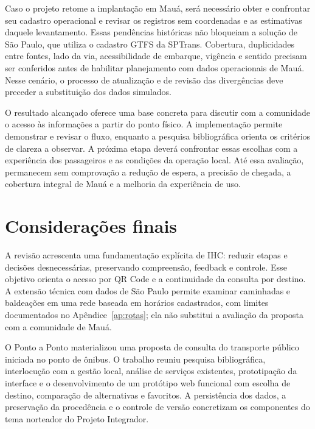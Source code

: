 \documentclass[12pt,oneside,a4paper,brazil,chapter=TITLE]{abntex2}
\begin{document}
Caso o projeto retome a implantação em Mauá, será necessário obter e confrontar seu cadastro operacional e revisar os registros sem coordenadas e as estimativas daquele levantamento. Essas pendências históricas não bloqueiam a solução de São Paulo, que utiliza o cadastro GTFS da SPTrans. Cobertura, duplicidades entre fontes, lado da via, acessibilidade de embarque, vigência e sentido precisam ser conferidos antes de habilitar planejamento com dados operacionais de Mauá. Nesse cenário, o processo de atualização e de revisão das divergências deve preceder a substituição dos dados simulados.

O resultado alcançado oferece uma base concreta para discutir com a comunidade o acesso às informações a partir do ponto físico. A implementação permite demonstrar e revisar o fluxo, enquanto a pesquisa bibliográfica orienta os critérios de clareza a observar. A próxima etapa deverá confrontar essas escolhas com a experiência dos passageiros e as condições da operação local. Até essa avaliação, permanecem sem comprovação a redução de espera, a precisão de chegada, a cobertura integral de Mauá e a melhoria da experiência de uso.

\chapter{Considerações finais}
A revisão acrescenta uma fundamentação explícita de IHC: reduzir etapas e decisões desnecessárias, preservando compreensão, feedback e controle. Esse objetivo orienta o acesso por QR Code e a continuidade da consulta por destino. A extensão técnica com dados de São Paulo permite examinar caminhadas e baldeações em uma rede baseada em horários cadastrados, com limites documentados no Apêndice~\ref{ap:rotas}; ela não substitui a avaliação da proposta com a comunidade de Mauá.

O Ponto a Ponto materializou uma proposta de consulta do transporte público iniciada no ponto de ônibus. O trabalho reuniu pesquisa bibliográfica, interlocução com a gestão local, análise de serviços existentes, prototipação da interface e o desenvolvimento de um protótipo web funcional com escolha de destino, comparação de alternativas e favoritos. A persistência dos dados, a preservação da procedência e o controle de versão concretizam os componentes do tema norteador do Projeto Integrador.
\end{document}
